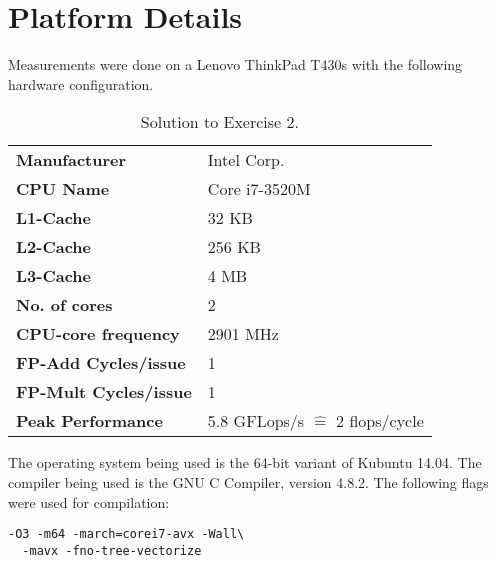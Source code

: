 \appendix
\section{Platform Details}

Measurements were done on a Lenovo ThinkPad T430s with the following hardware
configuration.

\begin{table}[H]
\begin{center}
\begin{tabular}{>{\bfseries}ll}
Manufacturer         & Intel Corp.\\
CPU Name             & Core i7-3520M\\
L1-Cache             & 32 KB\\
L2-Cache             & 256 KB\\
L3-Cache             & 4 MB\\
No. of cores         & 2\\
CPU-core frequency   & 2901 MHz\\
FP-Add Cycles/issue  & 1\\
FP-Mult Cycles/issue & 1\\
Peak Performance     & 5.8 GFLops/s $\hat{=}$ 2 flops/cycle
\end{tabular}
\end{center}
\caption{Solution to Exercise 2.}
\label{tblProc}
\end{table}

The operating system being used is the 64-bit variant of Kubuntu 14.04. The
compiler being used is the GNU C Compiler, version 4.8.2. The following flags
were used for compilation:

\begin{verbatim}
-O3 -m64 -march=corei7-avx -Wall\
  -mavx -fno-tree-vectorize
\end{verbatim}
